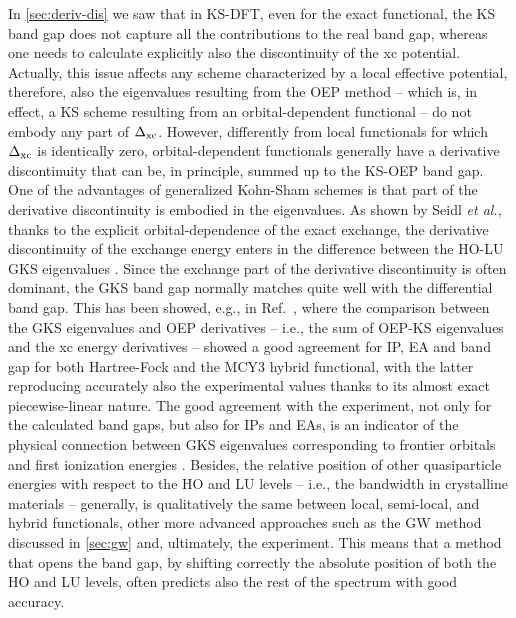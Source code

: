 In \cref{sec:deriv-dis} we saw that in KS-DFT, even for the exact functional, the KS band gap does not capture all the contributions to the real band gap, whereas one needs to calculate explicitly also the discontinuity of the xc potential. Actually, this issue affects any scheme characterized by a local effective potential, therefore, also the eigenvalues resulting from the OEP method -- which is, in effect, a KS scheme resulting from an orbital-dependent functional -- do not embody any part of $\Delta_{\rm xc}$. However, differently from local functionals for which $\Delta_{\rm xc}$ is identically zero, orbital-dependent functionals generally have a derivative discontinuity that can be, in principle, summed up to the KS-OEP band gap. One of the advantages of generalized Kohn-Sham schemes is that part of the derivative discontinuity is embodied in the eigenvalues. As shown by Seidl \emph{et al.}, thanks to the explicit orbital-dependence of the exact exchange, the derivative discontinuity of the exchange energy enters in the difference between the HO-LU GKS eigenvalues \cite{seidl_generalized_1996}. Since the exchange part of the derivative discontinuity is often dominant, the GKS band gap normally matches quite well with the differential band gap. This has been showed, e.g., in Ref.~\cite{cohen_fractional-charge_2008}, where the comparison between the GKS eigenvalues and OEP derivatives -- i.e., the sum of OEP-KS eigenvalues and the xc energy derivatives -- showed a good agreement for IP, EA and band gap for both Hartree-Fock and the MCY3 hybrid functional, with the latter reproducing accurately also the experimental values thanks to its almost exact piecewise-linear nature. The good agreement with the experiment, not only for the calculated band gaps, but also for IPs and EAs, is an indicator of the physical connection between GKS eigenvalues corresponding to frontier orbitals and first ionization energies \cite{perdew_understanding_2017}. Besides, the relative position of other quasiparticle energies with respect to the HO and LU levels -- i.e., the bandwidth in crystalline materials -- generally, is qualitatively the same between local, semi-local, and hybrid functionals, other more advanced approaches such as the GW method discussed in \cref{sec:gw} and, ultimately, the experiment. This means that a method that opens the band gap, by shifting correctly the absolute position of both the HO and LU levels, often predicts also the rest of the spectrum with good accuracy.

